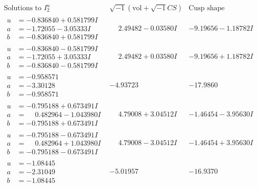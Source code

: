 \documentclass[1p]{elsarticle_modified}
\theoremstyle{definition}
\newcommand{\I}{\sqrt{-1}}
\begin{document}
$$\begin{array}{c|c|c}  
\text{Solutions to }I^u_{2}& \I (\text{vol} + \sqrt{-1}CS) & \text{Cusp shape}\\
 \hline 
\begin{aligned}
u &= -0.836840 + 0.581799 I \\
a &= -1.72055 - 3.05333 I \\
b &= -0.836840 + 0.581799 I\end{aligned}
 & \phantom{-}2.49482 - 0.03580 I & -9.19656 - 1.18782 I \\ \hline\begin{aligned}
u &= -0.836840 - 0.581799 I \\
a &= -1.72055 + 3.05333 I \\
b &= -0.836840 - 0.581799 I\end{aligned}
 & \phantom{-}2.49482 + 0.03580 I & -9.19656 + 1.18782 I \\ \hline\begin{aligned}
u &= -0.958571\phantom{ +0.000000I} \\
a &= -3.30128\phantom{ +0.000000I} \\
b &= -0.958571\phantom{ +0.000000I}\end{aligned}
 & -4.93723\phantom{ +0.000000I} & -17.9860\phantom{ +0.000000I} \\ \hline\begin{aligned}
u &= -0.795188 + 0.673491 I \\
a &= \phantom{-}0.482964 - 1.043980 I \\
b &= -0.795188 + 0.673491 I\end{aligned}
 & \phantom{-}4.79008 + 3.04512 I & -1.46454 - 3.95630 I \\ \hline\begin{aligned}
u &= -0.795188 - 0.673491 I \\
a &= \phantom{-}0.482964 + 1.043980 I \\
b &= -0.795188 - 0.673491 I\end{aligned}
 & \phantom{-}4.79008 - 3.04512 I & -1.46454 + 3.95630 I \\ \hline\begin{aligned}
u &= -1.08445\phantom{ +0.000000I} \\
a &= -2.31049\phantom{ +0.000000I} \\
b &= -1.08445\phantom{ +0.000000I}\end{aligned}
 & -5.01957\phantom{ +0.000000I} & -16.9370\phantom{ +0.000000I} \\ \hline\begin{aligned}

\end{aligned}
\end{array}$$
\end{document}
